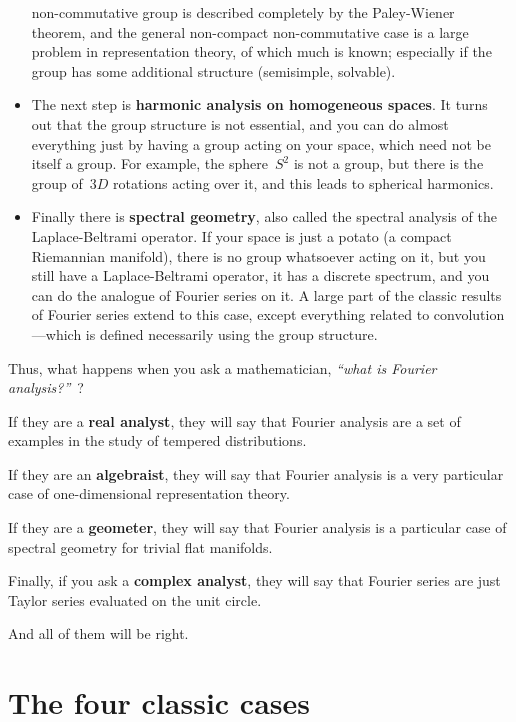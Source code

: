 \begin{itemize}
		non-commutative group is described completely by the
		Paley-Wiener theorem, and the general non-compact
		non-commutative case is a large problem in representation
		theory, of which much is known; especially if the group has
		some additional structure (semisimple, solvable).
	\item The next step is {\bf harmonic analysis on homogeneous
		spaces}.  It turns out that the group structure is not
		essential, and you can do almost everything just by having a
		group acting on your space, which need not be itself a group.
		For example, the sphere~$S^2$ is not a group, but there is the
		group of~$3D$ rotations acting over it, and this leads to
		spherical harmonics.
	\item Finally there is {\bf spectral geometry}, also called the
		spectral analysis of the Laplace-Beltrami operator.  If your
		space is just a potato (a compact Riemannian manifold), there
		is no group whatsoever acting on it, but you still have a
		Laplace-Beltrami operator, it has a discrete spectrum, and you
		can do the analogue of Fourier series on it.  A large part of
		the classic results of Fourier series extend to this case,
		except everything related to convolution---which is defined
		necessarily using the group structure.
\end{itemize}

Thus, what happens when you ask a mathematician, \emph{``what is
Fourier analysis?''}~?

If they are a {\bf real analyst}, they will say that Fourier analysis
are a set of examples in the study of tempered distributions.

If they are an {\bf algebraist}, they will say that Fourier analysis
is a very particular case of one-dimensional representation theory.

If they are a {\bf geometer}, they will say that Fourier analysis is
a particular case of spectral geometry for trivial flat manifolds.

Finally, if you ask a {\bf complex analyst}, they will say that
Fourier series are just Taylor series evaluated on the unit circle.

And all of them will be right.




\section{The four classic cases}

